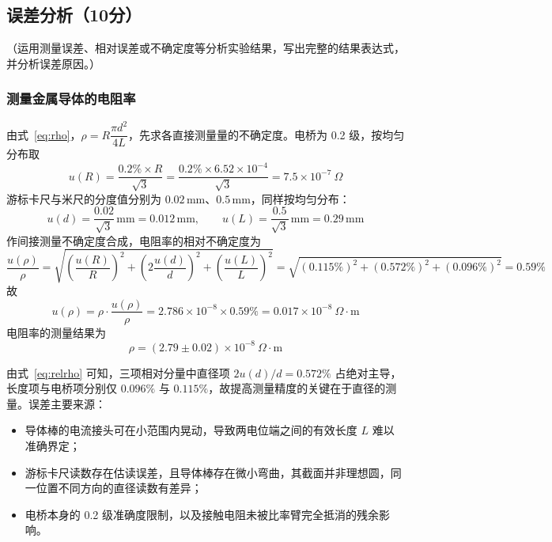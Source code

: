 \documentclass{Phyport}
\begin{document}
\subsection{误差分析（10分）}
（运用测量误差、相对误差或不确定度等分析实验结果，写出完整的结果表达式，并分析误差原因。）

\subsubsection{测量金属导体的电阻率}

由式~\eqref{eq:rho}，$\rho=R\dfrac{\pi d^2}{4L}$，先求各直接测量量的不确定度。电桥为 0.2 级，按均匀分布取
\begin{equation*}
    u(R)=\frac{0.2\%\times R}{\sqrt{3}}=\frac{0.2\%\times6.52\times10^{-4}}{\sqrt{3}}=7.5\times10^{-7}\ \Omega
\end{equation*}
游标卡尺与米尺的分度值分别为 $0.02\,\mathrm{mm}$、$0.5\,\mathrm{mm}$，同样按均匀分布：
\begin{equation*}
    u(d)=\frac{0.02}{\sqrt{3}}\,\mathrm{mm}=0.012\,\mathrm{mm},\qquad
    u(L)=\frac{0.5}{\sqrt{3}}\,\mathrm{mm}=0.29\,\mathrm{mm}
\end{equation*}
作间接测量不确定度合成，电阻率的相对不确定度为
\begin{equation}
    \frac{u(\rho)}{\rho}=\sqrt{\left(\frac{u(R)}{R}\right)^2+\left(2\frac{u(d)}{d}\right)^2+\left(\frac{u(L)}{L}\right)^2}
    =\sqrt{(0.115\%)^2+(0.572\%)^2+(0.096\%)^2}=0.59\%
    \label{eq:relrho}
\end{equation}
故
\begin{equation*}
    u(\rho)=\rho\cdot\frac{u(\rho)}{\rho}=2.786\times10^{-8}\times0.59\%=0.017\times10^{-8}\ \Omega\cdot\mathrm{m}
\end{equation*}
电阻率的测量结果为
\begin{equation*}
    \rho=(2.79\pm0.02)\times10^{-8}\ \Omega\cdot\mathrm{m}
\end{equation*}

由式~\eqref{eq:relrho} 可知，三项相对分量中直径项 $2u(d)/d=0.572\%$ 占绝对主导，长度项与电桥项分别仅 $0.096\%$ 与 $0.115\%$，故提高测量精度的关键在于直径的测量。误差主要来源：

\begin{itemize}
    \item 导体棒的电流接头可在小范围内晃动，导致两电位端之间的有效长度 $L$ 难以准确界定；
    \item 游标卡尺读数存在估读误差，且导体棒存在微小弯曲，其截面并非理想圆，同一位置不同方向的直径读数有差异；
    \item 电桥本身的 0.2 级准确度限制，以及接触电阻未被比率臂完全抵消的残余影响。
\end{itemize}
\end{document}
